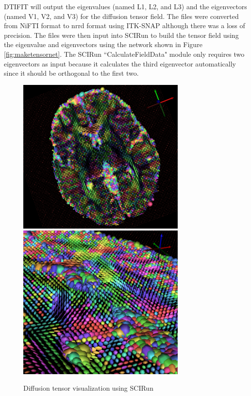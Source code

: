 DTIFIT will output the eigenvalues (named L1, L2, and L3) and the eigenvectors (named V1, V2, and V3) for the diffusion tensor field. The files were converted from NiFTI format to nrrd format using ITK-SNAP \cite{ref:itksnap} although there was a loss of precision. The files were then input into SCIRun to build the tensor field using the eigenvalue and eigenvectors using the network shown in Figure \ref{fig:maketensornet}. The SCIRun ``CalculateFieldData" module only requires two eigenvectors as input because it calculates the third eigenvector automatically since it should be orthogonal to the first two. 

\begin{figure}[p]
\begin{center}
\includegraphics[width=0.75\textwidth]{Figures/DTI_1.png}
\includegraphics[width=0.75\textwidth]{Figures/DTI_2.png}
\caption{Diffusion tensor visualization using SCIRun}
\label{fig:tensorvis}
\end{center}
\end{figure}

